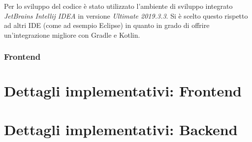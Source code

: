         Per lo sviluppo del codice è stato utilizzato l'ambiente di sviluppo integrato \emph{JetBrains Intellij IDEA} in versione \emph{Ultimate 2019.3.3}.
        Si è scelto questo rispetto ad altri IDE (come ad esempio Eclipse) in quanto in grado di offrire un'integrazione migliore con Gradle e Kotlin.

      \subsubsection{Frontend}





  \section{Dettagli implementativi: Frontend}
  \section{Dettagli implementativi: Backend}
